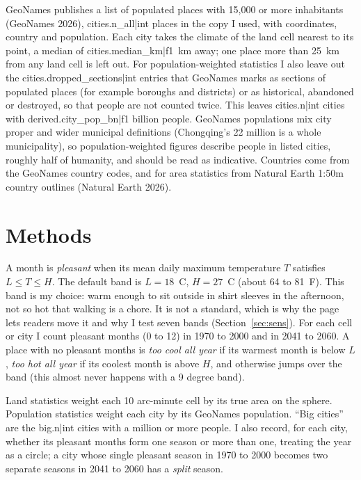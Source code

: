 \documentclass[11pt,a4paper]{article}
\begin{document}
GeoNames publishes a list of populated places with 15,000 or more inhabitants (GeoNames 2026), {{cities.n_all|int}} places in the copy I used, with coordinates, country and population. Each city takes the climate of the land cell nearest to its point, a median of {{cities.median_km|f1}}~km away; one place more than 25~km from any land cell is left out. For population-weighted statistics I also leave out the {{cities.dropped_sections|int}} entries that GeoNames marks as sections of populated places (for example boroughs and districts) or as historical, abandoned or destroyed, so that people are not counted twice. This leaves {{cities.n|int}} cities with {{derived.city_pop_bn|f1}} billion people. GeoNames populations mix city proper and wider municipal definitions (Chongqing's 22 million is a whole municipality), so population-weighted figures describe people in listed cities, roughly half of humanity, and should be read as indicative. Countries come from the GeoNames country codes, and for area statistics from Natural Earth 1:50m country outlines (Natural Earth 2026).

\section{Methods}

A month is \emph{pleasant} when its mean daily maximum temperature $T$ satisfies $L \le T \le H$. The default band is $L = 18$~\textdegree C, $H = 27$~\textdegree C (about 64 to 81~\textdegree F). This band is my choice: warm enough to sit outside in shirt sleeves in the afternoon, not so hot that walking is a chore. It is not a standard, which is why the page lets readers move it and why I test seven bands (Section~\ref{sec:sens}). For each cell or city I count pleasant months (0 to 12) in 1970 to 2000 and in 2041 to 2060. A place with no pleasant months is \emph{too cool all year} if its warmest month is below $L$, \emph{too hot all year} if its coolest month is above $H$, and otherwise jumps over the band (this almost never happens with a 9 degree band).

Land statistics weight each 10 arc-minute cell by its true area on the sphere. Population statistics weight each city by its GeoNames population. ``Big cities'' are the {{big.n|int}} cities with a million or more people. I also record, for each city, whether its pleasant months form one season or more than one, treating the year as a circle; a city whose single pleasant season in 1970 to 2000 becomes two separate seasons in 2041 to 2060 has a \emph{split} season.
\end{document}
